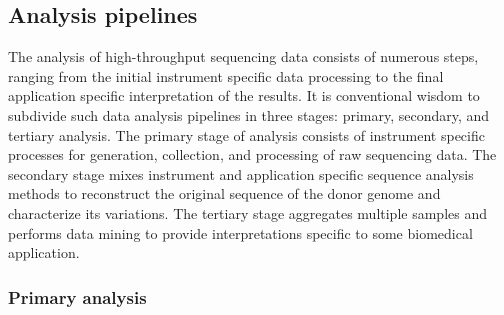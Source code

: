 
\subsection{Analysis pipelines}

The analysis of high-throughput sequencing data consists of numerous steps, ranging from the initial instrument specific data processing to the final application specific interpretation of the results.
It is conventional wisdom to subdivide such data analysis pipelines in three stages: primary, secondary, and tertiary analysis.
The primary stage of analysis consists of instrument specific processes for generation, collection, and processing of raw sequencing data.
The secondary stage mixes instrument and application specific sequence analysis methods to reconstruct the original sequence of the donor genome and characterize its variations.
The tertiary stage aggregates multiple samples and performs data mining to provide interpretations specific to some biomedical application.


\subsubsection{Primary analysis}

